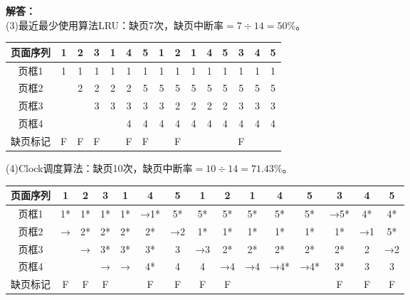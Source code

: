 \documentclass[10pt,a4paper,UTF8]{ctexart}
\newenvironment{solution}{\noindent\textbf{解答：}\\ \indent}{\par}
\begin{document}
\begin{solution}
	(3)最近最少使用算法LRU：缺页7次，缺页中断率$=7\div 14=50\%$。
	\begin{table}[H]
		\vspace{-0.5em}
		\centering
		\begin{tabular}{|c|c|c|c|c|c|c|c|c|c|c|c|c|c|c|}
		\hline
		页面序列 & 1 & 2 & 3 & 1 & 4 & 5 & 1 & 2 & 1 & 4 & 5 & 3 & 4 & 5 \\ \hline
		页框1  & 1 & 1 & 1 & 1 & 1 & 1 & 1 & 1 & 1 & 1 & 1 & 1 & 1 & 1 \\ \hline
		页框2  &   & 2 & 2 & 2 & 2 & 5 & 5 & 5 & 5 & 5 & 5 & 5 & 5 & 5 \\ \hline
		页框3  &   &   & 3 & 3 & 3 & 3 & 3 & 2 & 2 & 2 & 2 & 3 & 3 & 3 \\ \hline
		页框4  &   &   &   &   & 4 & 4 & 4 & 4 & 4 & 4 & 4 & 4 & 4 & 4 \\ \hline
		缺页标记 & F & F & F &   & F & F &   & F &   &   &   & F &   &   \\ \hline
		\end{tabular}
		\vspace{-1em}
	\end{table}

	(4)Clock调度算法：缺页10次，缺页中断率$=10\div 14=71.43\%$。
	\begin{table}[H]
		\vspace{-0.5em}
		\centering
		\begin{tabular}{|c|c|c|c|c|c|c|c|c|c|c|c|c|c|c|}
		\hline
		页面序列 & 1  & 2  & 3  & 1  & 4   & 5  & 1  & 2  & 1  & 4   & 5   & 3   & 4  & 5  \\ \hline
		页框1  & 1* & 1* & 1* & 1* & →1* & 5* & 5* & 5* & 5* & 5*  & 5*  & →5* & 4* & 4* \\ \hline
		页框2  & →  & 2* & 2* & 2* & 2*  & →2 & 1* & 1* & 1* & 1*  & 1*  & 1*  & →1 & 5* \\ \hline
		页框3  &    & →  & 3* & 3* & 3*  & 3  & →3 & 2* & 2* & 2*  & 2*  & 2*  & 2  & →2 \\ \hline
		页框4  &    &    & →  & →  & 4*  & 4  & 4  & →4 & →4 & →4* & →4* & 3*  & 3  & 3  \\ \hline
		缺页标记 & F  & F  & F  &    & F   & F  & F  & F  &    &     &     & F   & F  & F  \\ \hline
		\end{tabular}
		\vspace{-1em}
	\end{table}


\end{solution}
\end{document}
